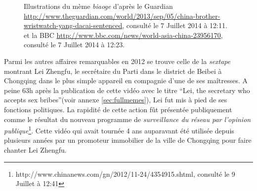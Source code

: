 \begin{figure}[htbp]
    \hspace{\fill}%
    \hspace{\fill}%
    \hspace{\fill}%
    \caption{ 
      Illustrations du mème \textit{biaoge} d'après le Guardian \url{http://www.theguardian.com/world/2013/sep/05/china-brother-wristwatch-yang-dacai-sentenced}, consulté le 7 Juillet 2014 à 12:11. et la BBC \url{http://www.bbc.com/news/world-asia-china-23956170}, consulté le 7 Juillet 2014 à 12:23.
    }
\end{figure}

Parmi les autres affaires remarquables en 2012 se trouve celle de la \textit{sextape} montrant Lei Zhengfu, le secrétaire du Parti dans le district de Beibei à Chongqing dans le plus simple appareil en compagnie d'une de ses maîtresses. A peine 63h après la publication de cette vidéo avec le titre ``Lei, the secretary who accepts sex bribes''(voir annexe \ref{sec:fullmemes}), Lei fut mis à pied de ses fonctions politiques. La rapidité de cette action fût présentée publiquement comme le résultat du nouveau programme de \textit{surveillance du réseau par l'opinion publique}\footnote{http://www.chinanews.com/gn/2012/11-24/4354915.shtml, consulté le 9 Juillet à 12:41}. Cette vidéo qui avait tournée 4 ans auparavant été utilisée depuis plusieurs années par un promoteur immobilier de la ville de Chongqing pour faire chanter Lei Zhengfu. 

